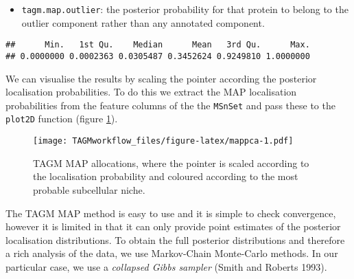 \documentclass[]{article}
\newenvironment{Shaded}{\begin{snugshade}}{\end{snugshade}}
\newcommand{\KeywordTok}[1]{\textcolor[rgb]{0.13,0.29,0.53}{\textbf{{#1}}}}
\newcommand{\DataTypeTok}[1]{\textcolor[rgb]{0.13,0.29,0.53}{{#1}}}
\newcommand{\FloatTok}[1]{\textcolor[rgb]{0.00,0.00,0.81}{{#1}}}
\newcommand{\StringTok}[1]{\textcolor[rgb]{0.31,0.60,0.02}{{#1}}}
\newcommand{\CommentTok}[1]{\textcolor[rgb]{0.56,0.35,0.01}{\textit{{#1}}}}
\newcommand{\NormalTok}[1]{{#1}}
\providecommand{\tightlist}{%
  \setlength{\itemsep}{0pt}\setlength{\parskip}{0pt}}
\begin{document}
\begin{itemize}
\tightlist
\item
  \texttt{tagm.map.outlier}: the posterior probability for that protein
  to belong to the outlier component rather than any annotated
  component.
\end{itemize}

\begin{Shaded}
\end{Shaded}

\begin{verbatim}
##      Min.   1st Qu.    Median      Mean   3rd Qu.      Max. 
## 0.0000000 0.0002363 0.0305487 0.3452624 0.9249810 1.0000000
\end{verbatim}

We can visualise the results by scaling the pointer according the
posterior localisation probabilities. To do this we extract the MAP
localisation probabilities from the feature columns of the the
\texttt{MSnSet} and pass these to the \texttt{plot2D} function (figure
\ref{fig:mappca}).

\begin{Shaded}
\end{Shaded}

\begin{figure}[htbp]
\centering
\texttt{[image: TAGMworkflow\_files/figure-latex/mappca-1.pdf]}
\caption{\label{fig:mappca}TAGM MAP allocations, where the pointer is scaled
according to the localisation probability and coloured according to the
most probable subcellular niche.}
\end{figure}

The TAGM MAP method is easy to use and it is simple to check
convergence, however it is limited in that it can only provide point
estimates of the posterior localisation distributions. To obtain the
full posterior distributions and therefore a rich analysis of the data,
we use Markov-Chain Monte-Carlo methods. In our particular case, we use
a \emph{collapsed Gibbs sampler} (Smith and Roberts 1993).
\end{document}
